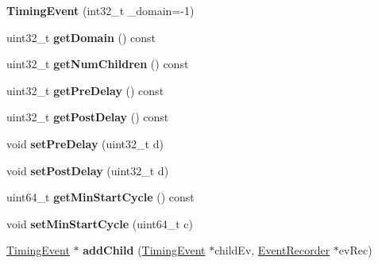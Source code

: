 \begin{DoxyCompactItemize}
\item 
\hypertarget{classTimingEvent_a9cb879fb72ed394efeec28d8aabf2559}{{\bfseries Timing\-Event} (int32\-\_\-t \-\_\-domain=-\/1)}\label{classTimingEvent_a9cb879fb72ed394efeec28d8aabf2559}

\item 
\hypertarget{classTimingEvent_a8541e32c1c59a979f635bde6c809ebb6}{uint32\-\_\-t {\bfseries get\-Domain} () const }\label{classTimingEvent_a8541e32c1c59a979f635bde6c809ebb6}

\item 
\hypertarget{classTimingEvent_a700e1a18857fd2292a28d42e146791d3}{uint32\-\_\-t {\bfseries get\-Num\-Children} () const }\label{classTimingEvent_a700e1a18857fd2292a28d42e146791d3}

\item 
\hypertarget{classTimingEvent_a6835885f10c5af3d2ef2bb1b57459009}{uint32\-\_\-t {\bfseries get\-Pre\-Delay} () const }\label{classTimingEvent_a6835885f10c5af3d2ef2bb1b57459009}

\item 
\hypertarget{classTimingEvent_a59e2e512d24bb6d2e25ca16752e43c3b}{uint32\-\_\-t {\bfseries get\-Post\-Delay} () const }\label{classTimingEvent_a59e2e512d24bb6d2e25ca16752e43c3b}

\item 
\hypertarget{classTimingEvent_ac2945c5c46334e344b6e1917edc058ca}{void {\bfseries set\-Pre\-Delay} (uint32\-\_\-t d)}\label{classTimingEvent_ac2945c5c46334e344b6e1917edc058ca}

\item 
\hypertarget{classTimingEvent_a9034f198649e39bf05e77eca1fe38404}{void {\bfseries set\-Post\-Delay} (uint32\-\_\-t d)}\label{classTimingEvent_a9034f198649e39bf05e77eca1fe38404}

\item 
\hypertarget{classTimingEvent_ad33a88bae422d9435a81b22e15f45ae6}{uint64\-\_\-t {\bfseries get\-Min\-Start\-Cycle} () const }\label{classTimingEvent_ad33a88bae422d9435a81b22e15f45ae6}

\item 
\hypertarget{classTimingEvent_add6357681c04aed9525ceac030716db1}{void {\bfseries set\-Min\-Start\-Cycle} (uint64\-\_\-t c)}\label{classTimingEvent_add6357681c04aed9525ceac030716db1}

\item 
\hypertarget{classTimingEvent_a06d4af1893169b4d7b565259d7cfa38b}{\hyperlink{classTimingEvent}{Timing\-Event} $\ast$ {\bfseries add\-Child} (\hyperlink{classTimingEvent}{Timing\-Event} $\ast$child\-Ev, \hyperlink{classEventRecorder}{Event\-Recorder} $\ast$ev\-Rec)}\label{classTimingEvent_a06d4af1893169b4d7b565259d7cfa38b}


\end{DoxyCompactItemize}
